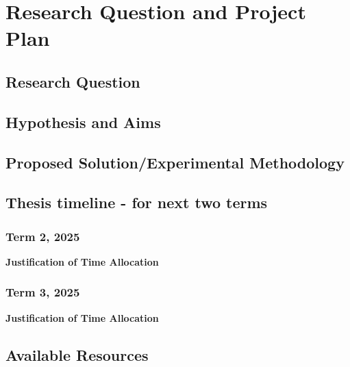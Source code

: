\section{Research Question and Project Plan}


\subsection{Research Question}
\subsection{Hypothesis and Aims}
\pagebreak

\subsection{Proposed Solution/Experimental Methodology}
\pagebreak

\subsection{Thesis timeline - for next two terms}
\subsubsection{Term 2, 2025}
\noindent \textbf{Justification of Time Allocation}
\pagebreak

\subsubsection{Term 3, 2025}
\noindent \textbf{Justification of Time Allocation}
\pagebreak

\subsection{Available Resources}
